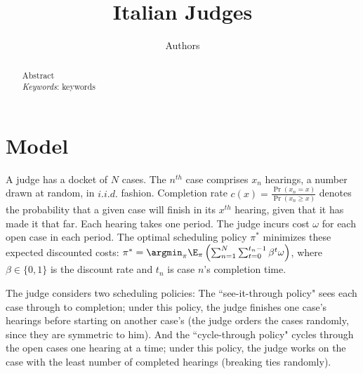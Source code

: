 

\newcommand{\cinp}{/Users/robertbray/Dropbox/code/getA/outputs/d/}


	\author{Authors}
	\doublespacing
	\title{Italian Judges}
	\maketitle

\begin{abstract}
	\noindent
	Abstract
	\\	\newline
	\noindent\emph{Keywords}: keywords
\end{abstract}


\section{Model}\label{s:intro}
	A judge has a docket of $N$ cases. The $ n^{th} $ case comprises $ x_n $ hearings, a number drawn at random, in $i.i.d.$ fashion. Completion rate $ c(x)=\frac{\Pr(x_n=x)}{\Pr(x_n\ge x)}$ denotes the probability that a given case will finish in its $x^{th}$ hearing, given that it has made it that far. Each hearing takes one period. The judge incurs cost $ \omega $ for each open case in each period. The optimal scheduling policy $ \pi^* $ minimizes these expected discounted costs: $\pi^*=\argmin_\pi \E_\pi\left (\sum_{n=1}^{N}\sum_{t=0}^{t_n-1} \beta^t\omega \right )$, where $ \beta \in \{0, 1\} $ is the discount rate and $ t_n $ is case $ n $'s  completion time.
	
	The judge considers two scheduling policies: The ``see-it-through policy" sees each case through to completion; under this policy, the judge finishes one case's hearings before starting on another case's (the judge orders the cases randomly, since they are symmetric to him). And the ``cycle-through policy" cycles through the open cases one hearing at a time; under this policy, the judge works on the case with the least number of completed hearings (breaking ties randomly).
	
